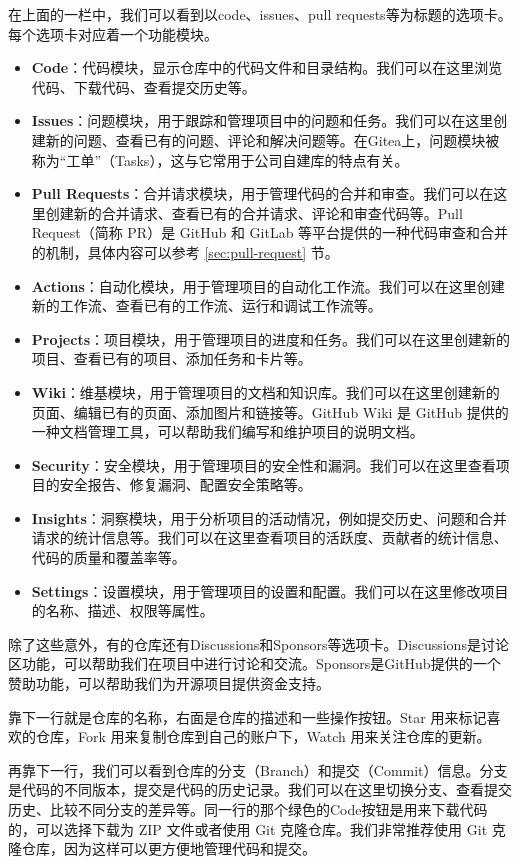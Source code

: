 在上面的一栏中，我们可以看到以code、issues、pull requests等为标题的选项卡。每个选项卡对应着一个功能模块。

\begin{itemize}
  \item \textbf{Code}：代码模块，显示仓库中的代码文件和目录结构。我们可以在这里浏览代码、下载代码、查看提交历史等。
  \item \textbf{Issues}：问题模块，用于跟踪和管理项目中的问题和任务。我们可以在这里创建新的问题、查看已有的问题、评论和解决问题等。在Gitea上，问题模块被称为“工单”（Tasks），这与它常用于公司自建库的特点有关。
  \item \textbf{Pull Requests}：合并请求模块，用于管理代码的合并和审查。我们可以在这里创建新的合并请求、查看已有的合并请求、评论和审查代码等。Pull Request（简称 PR）是 GitHub 和 GitLab 等平台提供的一种代码审查和合并的机制，具体内容可以参考 \ref{sec:pull-request} 节。
  \item \textbf{Actions}：自动化模块，用于管理项目的自动化工作流。我们可以在这里创建新的工作流、查看已有的工作流、运行和调试工作流等。
  \item \textbf{Projects}：项目模块，用于管理项目的进度和任务。我们可以在这里创建新的项目、查看已有的项目、添加任务和卡片等。
  \item \textbf{Wiki}：维基模块，用于管理项目的文档和知识库。我们可以在这里创建新的页面、编辑已有的页面、添加图片和链接等。GitHub Wiki 是 GitHub 提供的一种文档管理工具，可以帮助我们编写和维护项目的说明文档。
  \item \textbf{Security}：安全模块，用于管理项目的安全性和漏洞。我们可以在这里查看项目的安全报告、修复漏洞、配置安全策略等。
  \item \textbf{Insights}：洞察模块，用于分析项目的活动情况，例如提交历史、问题和合并请求的统计信息等。我们可以在这里查看项目的活跃度、贡献者的统计信息、代码的质量和覆盖率等。
  \item \textbf{Settings}：设置模块，用于管理项目的设置和配置。我们可以在这里修改项目的名称、描述、权限等属性。
\end{itemize}
除了这些意外，有的仓库还有Discussions和Sponsors等选项卡。Discussions是讨论区功能，可以帮助我们在项目中进行讨论和交流。Sponsors是GitHub提供的一个赞助功能，可以帮助我们为开源项目提供资金支持。

靠下一行就是仓库的名称，右面是仓库的描述和一些操作按钮。Star 用来标记喜欢的仓库，Fork 用来复制仓库到自己的账户下，Watch 用来关注仓库的更新。

再靠下一行，我们可以看到仓库的分支（Branch）和提交（Commit）信息。分支是代码的不同版本，提交是代码的历史记录。我们可以在这里切换分支、查看提交历史、比较不同分支的差异等。同一行的那个绿色的Code按钮是用来下载代码的，可以选择下载为 ZIP 文件或者使用 Git 克隆仓库。我们非常推荐使用 Git 克隆仓库，因为这样可以更方便地管理代码和提交。

